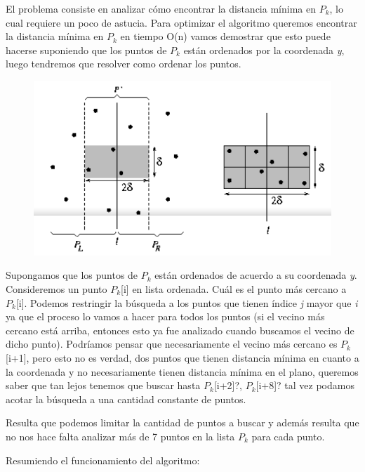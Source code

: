 El problema consiste en analizar cómo encontrar la distancia mínima en $P_{k}$, lo cual requiere un poco de astucia. Para optimizar el algoritmo queremos encontrar la distancia mínima en $P_{k}$ en tiempo O(n) vamos demostrar que esto puede hacerse suponiendo que los puntos de $P_{k}$ están ordenados por la coordenada {\em y}, luego tendremos que resolver como ordenar los puntos.

\begin{figure}[h]
	\centering 
	\includegraphics[scale=0.6]{img/closest_pair_1}
	\label{contexto:figura5}
\end{figure}

Supongamos que los puntos de $P_{k}$ están ordenados de acuerdo a su coordenada {\em y}. Consideremos un punto $P_{k}$[i] en lista ordenada. Cuál es el punto más cercano a $P_{k}$[i]. Podemos restringir la búsqueda a los puntos que tienen índice {\em j} mayor que {\em i} ya que el proceso lo vamos a hacer para todos los puntos (si el vecino más cercano está arriba, entonces esto ya fue analizado cuando buscamos el vecino de dicho punto). Podríamos pensar que necesariamente el vecino más cercano es  $P_{k}$[i+1], pero esto no es verdad, dos puntos que tienen distancia mínima en cuanto a la coordenada y no necesariamente tienen distancia mínima en el plano, queremos saber que tan lejos tenemos que buscar hasta $P_{k}$[i+2]?, $P_{k}$[i+8]? tal vez podamos acotar la búsqueda a una cantidad constante de puntos.

Resulta que podemos limitar la cantidad de puntos a buscar y además resulta que no nos hace falta analizar más de 7 puntos en la lista $P_{k}$ para cada punto.

Resumiendo el funcionamiento del algoritmo:

